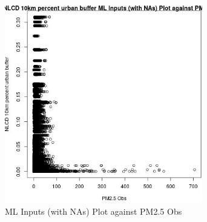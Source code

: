 \begin{figure} 
\centering  
\includegraphics[width=0.77\textwidth]{Code_Outputs/Report_ML_input_PM25_Step4_part_e_de_duplicated_aves_compiled_2019-05-14wNAs_NLCD_10km_percent_urban_buffervPM25_Obs.jpg} 
\caption{\label{fig:Report_ML_input_PM25_Step4_part_e_de_duplicated_aves_compiled_2019-05-14wNAsNLCD_10km_percent_urban_buffervPM25_Obs}ML Inputs (with NAs) Plot against PM2.5 Obs} 
\end{figure} 
 
